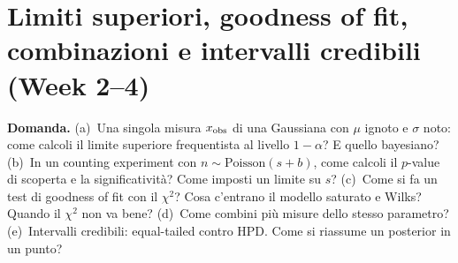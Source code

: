 \documentclass[11pt,a4paper]{article}
\newcommand{\Dom}[1]{\par\medskip\noindent\textbf{Domanda.} #1\par\nopagebreak}
\begin{document}
\section{Limiti superiori, goodness of fit, combinazioni e intervalli credibili (Week 2--4)}

\Dom{(a)~Una singola misura $x_{\rm obs}$ di una Gaussiana con $\mu$ ignoto e $\sigma$ noto: come calcoli il limite superiore frequentista al livello $1-\alpha$? E quello bayesiano?
(b)~In un counting experiment con $n\sim\mathrm{Poisson}(s+b)$, come calcoli il $p$-value di scoperta e la significativit\`a? Come imposti un limite su $s$?
(c)~Come si fa un test di goodness of fit con il $\chi^2$? Cosa c'entrano il modello saturato e Wilks? Quando il $\chi^2$ non va bene?
(d)~Come combini pi\`u misure dello stesso parametro?
(e)~Intervalli credibili: equal-tailed contro HPD. Come si riassume un posterior in un punto?}
\end{document}
